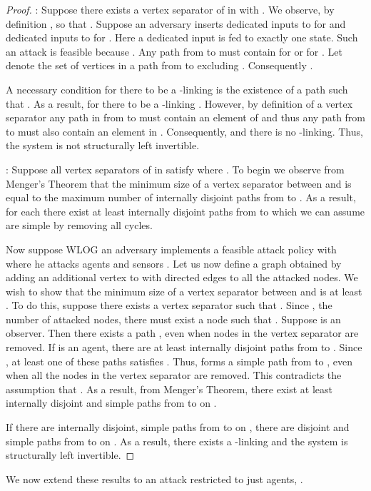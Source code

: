 \documentclass[letterpaper, 10 pt, conference]{ieeeconf}
\begin{document}
\begin{proof}
\textbf{ }:
Suppose there exists a vertex separator  of    in   with . We observe, by definition , so that . Suppose an adversary inserts dedicated inputs  to  for  and dedicated inputs  to  for . Here a dedicated input is fed to exactly one state. Such an attack is feasible because . Any path from  to  must contain  for  or  for  . Let  denote the set of vertices in a path from  to  excluding . Consequently . 

A necessary condition for there to be a -linking is the existence of a path  such that . As a result, for there to be a -linking . However, by definition of a vertex separator any path in  from  to  must contain an element of  and thus any path from  to  must also contain an element in . Consequently,  and there is no -linking. Thus, the system is not structurally left invertible.

\textbf{}:
Suppose all vertex separators  of  in  satisfy  where . To begin we observe from Menger's Theorem \cite{Menger1927} that the minimum size of a vertex separator between  and  is equal to the maximum number of internally disjoint paths from  to . As a result, for each  there exist at least  internally disjoint paths from  to  which we can assume are simple by removing all cycles.

Now suppose WLOG an adversary implements a feasible attack policy with  where he attacks  agents  and  sensors . Let us now define a graph  obtained by adding an additional vertex  to  with directed edges to all the attacked nodes. We wish to show that the minimum size of a vertex separator between  and  is at least .  To do this, suppose there exists a vertex separator  such that . Since , the number of attacked nodes, there must exist a node  such that . Suppose  is an observer. Then there exists a path , even when nodes in the vertex separator are removed. If  is an agent, there are at least  internally disjoint paths from  to . Since , at least one of these paths  satisfies . Thus,  forms a simple path from  to , even when all the nodes in the vertex separator  are removed. This contradicts the assumption that . As a result, from Menger's Theorem, there exist at least  internally disjoint and simple paths from  to  on .

If there are  internally disjoint, simple paths from  to  on , there are  disjoint and simple paths from  to  on . As a result, there exists a -linking and the system is structurally left invertible.
\end{proof}
We now extend these results to an attack restricted to just agents, .
\end{document}
